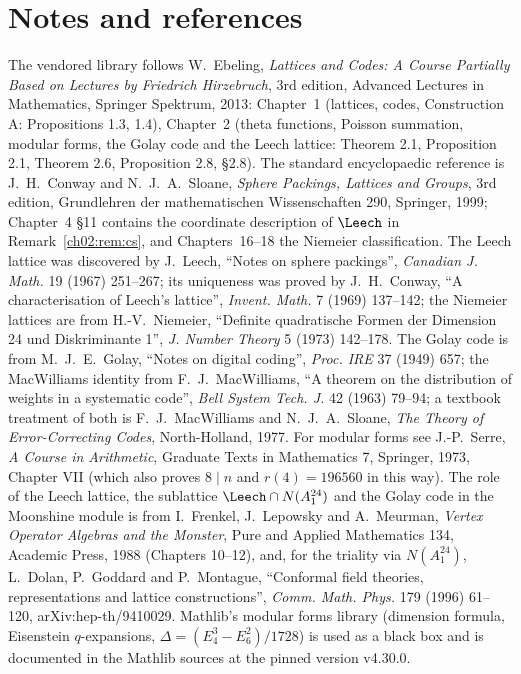 \section{Notes and references}\label{ch02:sec:notes}

The vendored library follows W.~Ebeling, \emph{Lattices and Codes: A Course Partially Based on
Lectures by Friedrich Hirzebruch}, 3rd edition, Advanced Lectures in Mathematics, Springer
Spektrum, 2013: Chapter~1 (lattices, codes, Construction A: Propositions 1.3, 1.4), Chapter~2
(theta functions, Poisson summation, modular forms, the Golay code and the Leech lattice:
Theorem 2.1, Proposition 2.1, Theorem 2.6, Proposition 2.8, \S2.8).  The standard encyclopaedic
reference is J.~H.~Conway and N.~J.~A.~Sloane, \emph{Sphere Packings, Lattices and Groups}, 3rd
edition, Grundlehren der mathematischen Wissenschaften 290, Springer, 1999; Chapter~4 \S11 contains
the coordinate description of $\Leech$ in Remark~\ref{ch02:rem:cs}, and Chapters~16--18 the
Niemeier classification.  The Leech lattice was discovered by J.~Leech, ``Notes on sphere
packings'', \emph{Canadian J. Math.} 19 (1967) 251--267; its uniqueness was proved by J.~H.~Conway,
``A characterisation of Leech's lattice'', \emph{Invent. Math.} 7 (1969) 137--142; the Niemeier
lattices are from H.-V.~Niemeier, ``Definite quadratische Formen der Dimension 24 und
Diskriminante 1'', \emph{J. Number Theory} 5 (1973) 142--178.  The Golay code is from M.~J.~E.~Golay,
``Notes on digital coding'', \emph{Proc. IRE} 37 (1949) 657; the MacWilliams identity from
F.~J.~MacWilliams, ``A theorem on the distribution of weights in a systematic code'', \emph{Bell
System Tech. J.} 42 (1963) 79--94; a textbook treatment of both is F.~J.~MacWilliams and
N.~J.~A.~Sloane, \emph{The Theory of Error-Correcting Codes}, North-Holland, 1977.  For modular
forms see J.-P.~Serre, \emph{A Course in Arithmetic}, Graduate Texts in Mathematics 7, Springer,
1973, Chapter VII (which also proves $8\mid n$ and $r(4)=196560$ in this way).  The role of the
Leech lattice, the sublattice $\Leech\cap N(A_1^{24})$ and the Golay code in the Moonshine module
is from I.~Frenkel, J.~Lepowsky and A.~Meurman, \emph{Vertex Operator Algebras and the Monster},
Pure and Applied Mathematics 134, Academic Press, 1988 (Chapters 10--12), and, for the triality
via $N(A_1^{24})$, L.~Dolan, P.~Goddard and P.~Montague, ``Conformal field theories, representations and
lattice constructions'', \emph{Comm. Math. Phys.} 179 (1996) 61--120, arXiv:hep-th/9410029.  Mathlib's
modular forms library (dimension formula, Eisenstein $q$-expansions, $\Delta=(E_4^3-E_6^2)/1728$)
is used as a black box and is documented in the Mathlib sources at the pinned version v4.30.0.
